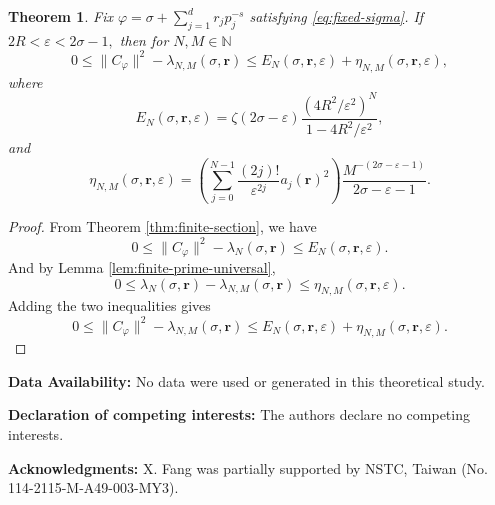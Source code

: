 \documentclass[12pt, reqno]{amsart}
\numberwithin{equation}{section}
\newtheorem{theorem}{Theorem}[section]
\begin{document}
\begin{theorem}\label{thm:full-error-estimate}
Fix $\varphi=\sigma+\sum_{j=1}^{d}r_jp_j^{-s}$ satisfying  \eqref{eq:fixed-sigma}.
If $2R<\varepsilon<2\sigma-1,$ then
for $N,M\in\mathbb{N}$
\[
0\leq
\|C_{\varphi}\|^{2}
-
\lambda_{N,M}(\sigma,\boldsymbol{r})
\leq
E_N(\sigma,\boldsymbol{r},\varepsilon)
+
\eta_{N,M}(\sigma,\boldsymbol{r},\varepsilon),
\]
where
\[
E_N(\sigma,\boldsymbol{r},\varepsilon)
=
\zeta(2\sigma-\varepsilon)
\frac{(4R^{2}/\varepsilon^{2})^{N}}{1-4R^{2}/\varepsilon^{2}},
\] and
\[
\eta_{N,M}(\sigma,\boldsymbol{r},\varepsilon)
=
\left(
\sum_{j=0}^{N-1}
\frac{(2j)!}{\varepsilon^{2j}}a_j(\boldsymbol{r})^{2}
\right)
\frac{M^{-(2\sigma-\varepsilon-1)}}{2\sigma-\varepsilon-1}.
\]
\end{theorem}
\begin{proof}
From Theorem \ref{thm:finite-section}, we have
\[
0\leq
\|C_{\varphi}\|^{2}
-
\lambda_N(\sigma,\boldsymbol{r})
\leq
E_N(\sigma,\boldsymbol{r},\varepsilon).
\]
And by Lemma \ref{lem:finite-prime-universal},
\[
0\leq
\lambda_N(\sigma,\boldsymbol{r})
-
\lambda_{N,M}(\sigma,\boldsymbol{r})
\leq
\eta_{N,M}(\sigma,\boldsymbol{r},\varepsilon).
\]
Adding the two inequalities gives
\[
0\leq
\|C_{\varphi}\|^{2}
-
\lambda_{N,M}(\sigma,\boldsymbol{r})
\leq
E_N(\sigma,\boldsymbol{r},\varepsilon)
+
\eta_{N,M}(\sigma,\boldsymbol{r},\varepsilon).
\]
\end{proof}


\vspace{0.2in}

\noindent\textbf{Data Availability:} No data were used or generated in this theoretical study.

\vspace{0.2in}
\noindent\textbf{Declaration of competing interests:}
The authors declare no competing interests.

\vspace{0.2in}
\noindent\textbf{Acknowledgments:}
X. Fang was partially supported by NSTC, Taiwan (No. 114-2115-M-A49-003-MY3).

\printbibliography
\end{document}
